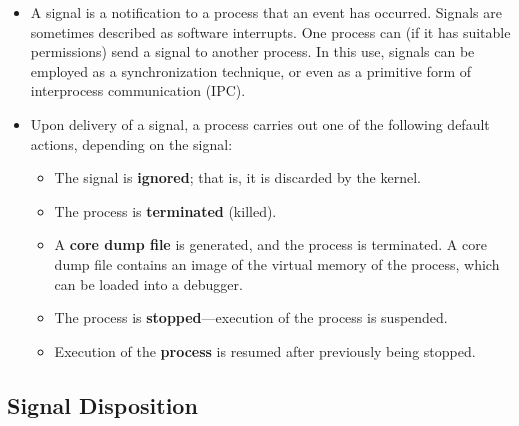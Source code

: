 \documentclass[]{article}
\begin{document}
\begin{itemize}
\item
  A signal is a notification to a process that an event has occurred.
  Signals are sometimes described as software interrupts. One process
  can (if it has suitable permissions) send a signal to another process.
  In this use, signals can be employed as a synchronization technique,
  or even as a primitive form of interprocess communication (IPC).
\item
  Upon delivery of a signal, a process carries out one of the following
  default actions, depending on the signal:

  \begin{itemize}
  \item
    The signal is \textbf{ignored}; that is, it is discarded by the
    kernel.
  \item
    The process is \textbf{terminated} (killed).
  \item
    A \textbf{core dump file} is generated, and the process is
    terminated. A core dump file contains an image of the virtual memory
    of the process, which can be loaded into a debugger.
  \item
    The process is \textbf{stopped}---execution of the process is
    suspended.
  \item
    Execution of the \textbf{process} is resumed after previously being
    stopped.
  \end{itemize}
\end{itemize}

\subsection{\texorpdfstring{\textbf{Signal
Disposition}}{Signal Disposition}}\label{header-n483}
\end{document}
